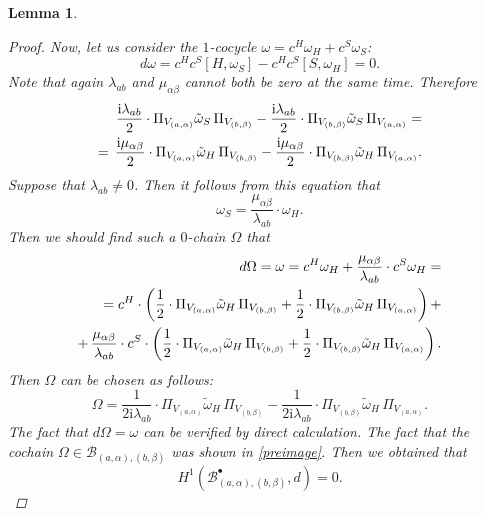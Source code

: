 \documentclass[10pt,a4paper]{amsart}
\newtheorem{lemma}{Lemma}
\begin{document}
\begin{lemma}
\begin{proof}
 Now, let us consider the $1$-cocycle $\omega=c^{H}\omega_{H}+c^{S}\omega_{S}$:
        \begin{equation}
            d\omega=c^{H}c^{S}[H,\omega_{S}]-c^{H}c^{S}[S,\omega_{H}]=0.
        \end{equation}
        Note that again $\lambda_{ab}$ and $\mu_{\alpha\beta}$ cannot both be zero at the same time. Therefore
        \begin{eqnarray}
            \notag\frac{\mathrm{i}\lambda_{ab}}{2}\cdot \Pi_{V_{(a,\alpha)}}\tilde{\omega}_{S}\,\Pi_{V_{(b,\beta)}}-\frac{\mathrm{i}\lambda_{ab}}{2}\cdot \Pi_{V_{(b,\beta)}}\tilde{\omega}_{S}\,\Pi_{V_{(a,\alpha)}}=\\=\,\frac{\mathrm{i}\mu_{\alpha\beta}}{2}\cdot \Pi_{V_{(a,\alpha)}}\tilde{\omega}_{H}\,\Pi_{V_{(b,\beta)}}-\frac{\mathrm{i}\mu_{\alpha\beta}}{2}\cdot \Pi_{V_{(b,\beta)}}\tilde{\omega}_{H}\,\Pi_{V_{(a,\alpha)}}.
        \end{eqnarray}
        Suppose that $\lambda_{ab}\neq 0$. Then it follows from this equation that 
        \begin{equation}
            \omega_{S}=\frac{\mu_{\alpha\beta}}{\lambda_{ab}}\cdot \omega_{H}.
        \end{equation}
        Then we should find such a $0$-chain $\Omega$ that
        \begin{eqnarray}
            \notag d\Omega=\omega=c^{H}\omega_{H}+\frac{\mu_{\alpha\beta}}{\lambda_{ab}}\cdot c^{S}\omega_{H}=\\\notag=c^{H}\cdot \left(\frac{1}{2}\cdot \Pi_{V_{(a,\alpha)}}\tilde{\omega}_{H}\,\Pi_{V_{(b,\beta)}}+\frac{1}{2}\cdot \Pi_{V_{(b,\beta)}}\tilde{\omega}_{H}\,\Pi_{V_{(a,\alpha)}}\right)+\\ +\,\frac{\mu_{\alpha\beta}}{\lambda_{ab}}\cdot c^{S}\cdot \left(\frac{1}{2}\cdot \Pi_{V_{(a,\alpha)}}\tilde{\omega}_{H}\,\Pi_{V_{(b,\beta)}}+\frac{1}{2}\cdot \Pi_{V_{(b,\beta)}}\tilde{\omega}_{H}\,\Pi_{V_{(a,\alpha)}}\right).
        \end{eqnarray}
        Then $\Omega$ can be chosen as follows:
        \begin{equation}
            \Omega = \frac{1}{2\mathrm{i}\lambda_{ab}}\cdot \Pi_{V_{(a,\alpha)}}\tilde{\omega}_{H}\,\Pi_{V_{(b,\beta)}}-\frac{1}{2\mathrm{i}\lambda_{ab}}\cdot \Pi_{V_{(b,\beta)}}\tilde{\omega}_{H}\,\Pi_{V_{(a,\alpha)}}.
        \end{equation}
        The fact that $d\Omega=\omega$ can be verified by direct calculation. The fact that the cochain $\Omega\in\mathcal{B}_{(a,\alpha),(b,\beta)}$ was shown in \eqref{preimage}. Then we obtained that
        \begin{equation}
        H^{1}(\mathcal{B}^{\bullet}_{(a,\alpha),(b,\beta)},d)=0.
        \end{equation}


\end{proof}
\end{lemma}
\end{document}

